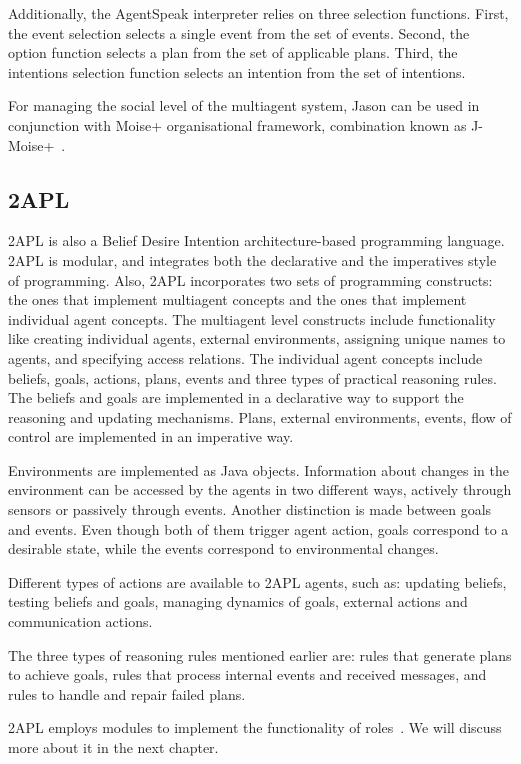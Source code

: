 \documentclass[a4paper,12pt,oneside,fleqn]{book} %
\begin{document}
Additionally, the AgentSpeak interpreter relies on three selection
functions. First, the event selection selects a single event from the set
of events. Second, the option function selects a plan from the set of
applicable plans. Third, the intentions selection function selects an
intention from the set of intentions.

For managing the social level of the multiagent system, Jason can be used
in conjunction with Moise+ organisational framework, combination known as
J-Moise+~\cite{hubner2007j}.


\subsection{2APL} %
2APL is also a Belief Desire Intention architecture-based programming
language. 2APL is modular, and integrates both the declarative and the
imperatives style of programming. Also, 2APL incorporates two sets of
programming constructs: the ones that implement multiagent concepts and the
ones that implement individual agent concepts. The multiagent level
constructs include functionality like creating individual agents, external
environments, assigning unique names to agents, and specifying access
relations. The individual agent concepts include beliefs, goals, actions,
plans, events and three types of practical reasoning rules. The beliefs and
goals are implemented in a declarative way to support the reasoning and
updating mechanisms. Plans, external environments, events, flow of control
are implemented in an imperative way.

Environments are implemented as Java objects. Information about changes in
the environment can be accessed by the agents in two different ways,
actively through sensors or passively through events. Another distinction
is made between goals and events. Even though both of them trigger agent
action, goals correspond to a desirable state, while the events correspond
to environmental changes.

Different types of actions are available to 2APL agents, such as: updating
beliefs, testing beliefs and goals, managing dynamics of goals, external
actions and communication actions.

The three types of reasoning rules mentioned earlier are: rules that
generate plans to achieve goals, rules that process internal events and
received messages, and rules to handle and repair failed plans.

2APL employs modules to implement the functionality of
roles~\cite{dblp:conf/prima/dastanims08}. We will discuss more about it in
the next chapter.
\end{document}
